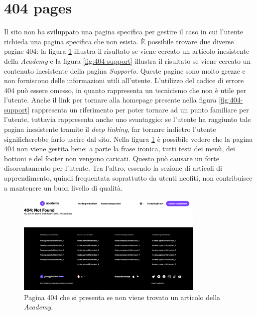 \section{404 pages}

Il sito non ha sviluppato una pagina specifica per gestire il caso in cui 
l'utente richieda una pagina specifica che non esista. È possibile trovare 
due diverse pagine 404: la figura \ref{fig:404-academy} illustra il 
risultato se viene cercato un articolo inesistente della \textit{Academy} 
e la figura \ref{fig:404-support} illustra il risultato se viene cercato 
un contenuto inesistente della pagina \textit{Supporto}. Queste pagine sono 
molto grezze e non forniscono delle informazioni utili all'utente. 
L'utilizzo del codice di errore 404 può essere omesso, in quanto rappresenta 
un tecnicismo che non è utile per l'utente. Anche il link per tornare alla 
homepage presente nella figura \ref{fig:404-support} rappresenta un 
riferimento per poter tornare ad un punto familiare per l'utente, tuttavia 
rappresenta anche uno svantaggio: se l'utente ha raggiunto tale pagina 
inesistente tramite il \textit{deep linking}, far tornare indietro 
l'utente significherebbe farlo uscire dal sito. Nella figura 
\ref{fig:404-academy} è possibile vedere che la pagina 404 non viene 
gestita bene: a parte la frase ironica, tutti testi dei menù, dei bottoni 
e del footer non vengono caricati. Questo può causare un forte 
disorentamento per l'utente. Tra l'altro, essendo la sezione di articoli 
di apprendimento, quindi frequentata soprattutto da utenti neofiti, non 
contribuisce a mantenere un buon livello di qualità.

\begin{figure}[H]
  \centering
  \includegraphics[width=0.80\textwidth]{res/images/404-academy.png}
  \caption{Pagina 404 che si presenta se non viene trovato un articolo 
  della \textit{Academy}.}
  \label{fig:404-academy}
\end{figure}

